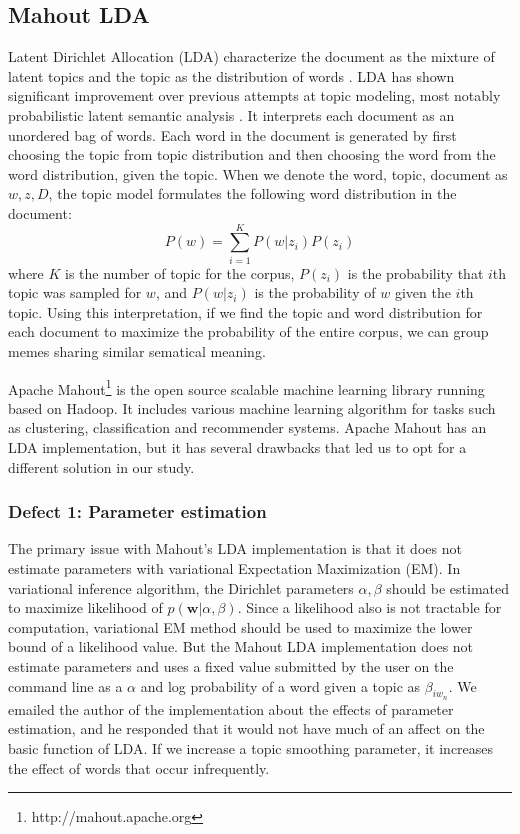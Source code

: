\documentclass{sig-alternate}
\begin{document}
\subsection{Mahout LDA}
Latent Dirichlet Allocation (LDA)  characterize the document as the mixture of latent topics and the topic as the distribution of words \cite{Blei2003a}. LDA has shown significant improvement over previous attempts at topic modeling, most notably probabilistic latent semantic analysis \cite{Hofmann1999}.  It interprets each document as an unordered bag of words. Each word in the document is generated by first choosing the topic from topic distribution and then choosing the word from the word distribution, given the topic. When we denote the word, topic, document as $w, z, D$, the topic model formulates the following word distribution in the document:
\begin{displaymath}
 P(w)=\sum_{i=1}^K P(w|z_i)P(z_i)
\end{displaymath}
where $K$ is the number of topic for the corpus, $P(z_i)$ is the probability that $i$th topic was sampled for $w$, and $P(w|z_i)$ is the probability of $w$ given the $i$th topic. Using this interpretation, if we find the topic and word distribution for each document to maximize the probability of the entire corpus, we can group memes sharing similar sematical meaning.

Apache Mahout\footnote{http://mahout.apache.org} is the open source scalable machine learning library running based on Hadoop. It includes various machine learning algorithm for tasks such as  clustering, classification and recommender systems. Apache Mahout has an LDA implementation, but it has several drawbacks that led us to opt for a different solution in our study.

\subsubsection{Defect 1: Parameter estimation}
The primary issue with Mahout's LDA implementation is that it does not estimate parameters with variational Expectation Maximization (EM). In variational inference algorithm, the Dirichlet parameters $\alpha, \beta$ should be estimated to maximize likelihood of $p(\mathbf{w}|\alpha,\beta)$. Since a likelihood also is not tractable for computation, variational EM method should be used to maximize the lower bound of a likelihood value. But the Mahout LDA implementation does not estimate parameters and uses a fixed value submitted by the user on the command line as a $\alpha$ and log probability of a word given a topic as $\beta_{iw_n}$. We emailed the author of the implementation about the effects of parameter estimation, and he responded that it would not have much of an affect on the basic function of LDA. If we increase a topic smoothing parameter, it increases the effect of words that occur infrequently.
\end{document}
